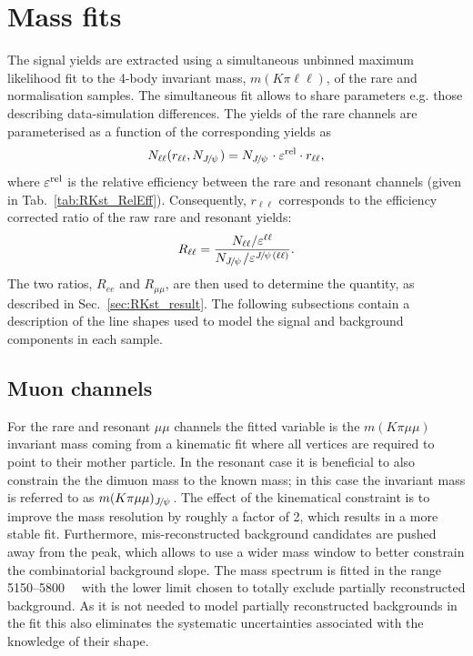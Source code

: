 \section{Mass fits}
\label{sec:rkst_fits}

The signal yields are extracted using a simultaneous unbinned maximum likelihood fit
to the 4-body invariant mass, $m(K\pi\ell\ell)$, of the rare and normalisation samples.
The simultaneous fit allows to share parameters e.g. those describing data-simulation differences.
The yields of the rare channels are parameterised as a function of the corresponding \jpsi yields as
%
\begin{equation}
N_{\ell\ell}(r_{\ell\ell}, N_{\jpsi}) = N_{\jpsi} \cdot \varepsilon^{\rm rel} \cdot r_{\ell\ell},
\end{equation}
%
where $\varepsilon^{\rm rel}$ is the relative efficiency between the rare and resonant channels
(given in Tab.~\ref{tab:RKst_RelEff}). Consequently, $r_{\ell\ell}$ corresponds to the efficiency corrected
ratio of the raw rare and resonant yields:
%
\begin{equation}
R_{\ell\ell} = \frac{N_{\ell\ell} / \varepsilon^{\ell\ell}}{N_{\jpsi} / \varepsilon^{\jpsi(\ell\ell)}}.
\end{equation}
%
The two ratios, $R_{ee}$ and $R_{\mu\mu}$, are then used to determine
the \RKst quantity, as described in Sec.~\ref{sec:RKst_result}.
The following subsections contain a description of the line shapes used to model
the signal and background components in each sample.

\subsection{Muon channels}

For the rare and resonant $\mu\mu$ channels the fitted variable is the $m(K\pi \mu\mu)$ invariant mass coming
from a kinematic fit where all vertices are required to point to their mother particle.
In the resonant case it is beneficial to also constrain the the dimuon mass to the known \jpsi mass;
in this case the invariant mass is referred to as $m(K\pi \mu\mu)_\jpsi$.
The effect of the kinematical constraint is to improve the mass resolution by roughly a factor of 2, which results
in a more stable fit. Furthermore, mis-reconstructed background candidates are pushed away from
the \Bz peak, which allows to use a wider mass window to better constrain the combinatorial background slope.
The mass spectrum is fitted in the range 5150--5800~\mevcc~ with the lower limit
chosen to totally exclude partially reconstructed background.
As it is not needed to model partially reconstructed backgrounds in the fit this also
eliminates the systematic uncertainties associated with the knowledge of their shape. 


